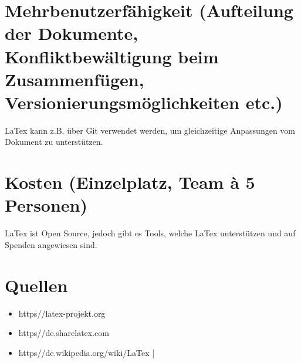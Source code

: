 \documentclass[12pt]{article}
\begin{document}
\section{Mehrbenutzerfähigkeit (Aufteilung der Dokumente, Konfliktbewältigung beim Zusammenfügen,
Versionierungsmöglichkeiten etc.)}
LaTex kann z.B. über Git verwendet werden, um gleichzeitige Anpassungen vom Dokument zu unterstützen.

\section{Kosten (Einzelplatz, Team à 5 Personen)}
LaTex ist Open Source, jedoch gibt es Tools, welche LaTex unterstützen und auf Spenden angewiesen sind.

\section{Quellen}
\begin{itemize}
	\item https//latex-projekt.org
	\item https//de.sharelatex.com
	\item https//de.wikipedia.org/wiki/LaTex
|\end{itemize}
\end{document}
